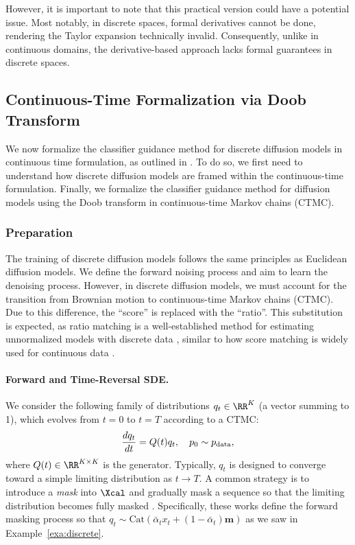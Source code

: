 However, it is important to note that this practical version could have a potential issue. Most notably, in discrete spaces, formal derivatives cannot be done, rendering the Taylor expansion technically invalid. Consequently, unlike in continuous domains, the derivative-based approach lacks formal guarantees in discrete spaces.

{ \subsection{Continuous-Time Formalization via Doob Transform}} 



We now formalize the classifier guidance method for discrete diffusion models in continuous time formulation, as outlined in . To do so, we first need to understand how discrete diffusion models are framed within the continuous-time formulation. Finally, we formalize the classifier guidance method for diffusion models using the Doob transform in continuous-time Markov chains (CTMC).

\subsubsection{Preparation}

The training of discrete diffusion models follows the same principles as Euclidean diffusion models. We define the forward noising process and aim to learn the denoising process. However, in discrete diffusion models, we must account for the transition from Brownian motion to continuous-time Markov chains (CTMC). Due to this difference, the ``score'' is replaced with the ``ratio''. This substitution is expected, as ratio matching is a well-established method for estimating unnormalized models with discrete data \citep{hyvarinen2007some}, similar to how score matching is widely used for continuous data \citep{hyvarinen2005estimation}.

\paragraph{Forward and Time-Reversal SDE.}

We consider the following family of distributions $q_t \in \RR^{K}$ (a vector summing to 1),  which evolves from $t=0$ to $t=T$ according to a CTMC:
\begin{align*} 
\frac{dq_t}{dt} = Q(t) q_t,\quad p_0\sim p_{\mathrm{data}}, 
\end{align*} 
where $Q(t) \in \RR^{K \times K}$ is the generator. Typically, $q_t$ is designed to converge toward a simple limiting distribution as $t \to T$.  A common strategy is to introduce a \textit{mask} into $\Xcal$ and gradually mask a sequence so that the limiting distribution becomes fully masked \citep{shi2024simplified,sahoo2024simple}. Specifically, these works define the forward masking process so that $q_t \sim \mathrm{Cat}(\bar \alpha_t x_t + (1 - \bar \alpha_t) \mathbf{m})$ as we saw in Example~\ref{exa:discrete}.

